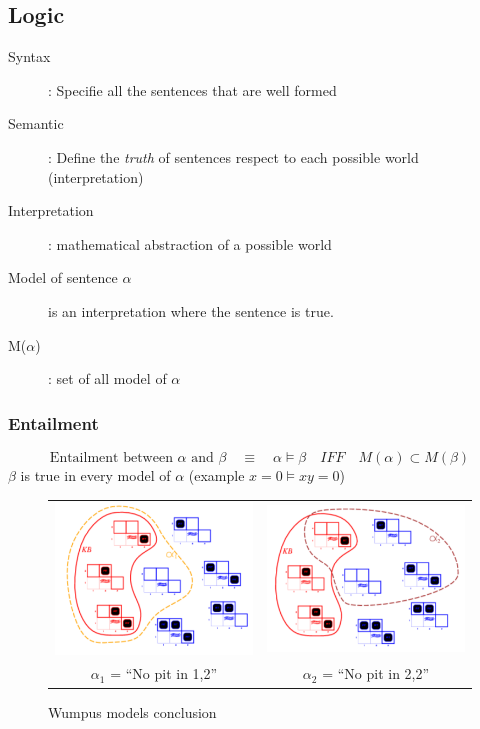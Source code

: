 \subsection{Logic}
\begin{description}
    \item[Syntax] : Specifie all the sentences that are well formed
    \item[Semantic] : Define the \textit{truth} of sentences respect to each
        possible world (interpretation)
    \item[Interpretation] : mathematical abstraction of a possible world
    \item[Model of sentence $\alpha$] is an interpretation where the sentence 
        is true. 
    \item[M($\alpha$)] : set of all model of $\alpha$
\end{description}

\subsubsection{Entailment} 
$$\textrm{Entailment between } \alpha \textrm{ and } \beta
\quad \equiv \quad \alpha \models \beta  \quad IFF \quad M(\alpha) \subset M(\beta)$$
$\beta$ is true in every model of $\alpha$ (example $x=0 \models xy=0$)

\begin{figure}[h]
    \centering
    \begin{tabular}{cc}
        \includegraphics[width=6cm]{alpha_1.png}
        &
        \includegraphics[width=6cm]{alpha_2.png}
        \\
        $\alpha_1$ = ``No pit in 1,2''
        &
        $\alpha_2$ = ``No pit in 2,2''
        \\
    \end{tabular}
    \caption{Wumpus models conclusion}
\end{figure}

